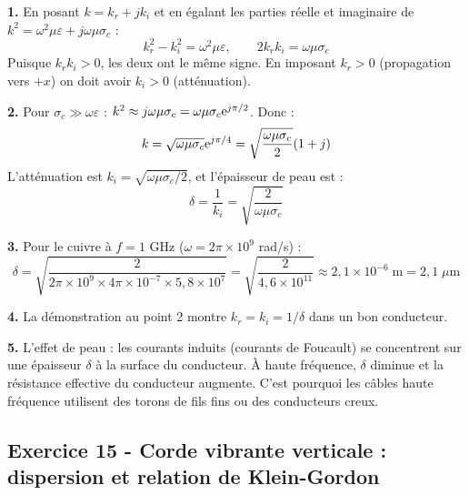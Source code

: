 \documentclass[12pt,a4paper]{article}
\begin{document}
\begin{boitecorrige}
\textbf{1.} En posant $k = k_r+jk_i$ et en égalant les parties réelle et imaginaire de $k^2 = \omega^2\mu\varepsilon + j\omega\mu\sigma_c$ :
\[
k_r^2 - k_i^2 = \omega^2\mu\varepsilon, \qquad 2k_r k_i = \omega\mu\sigma_c
\]
Puisque $k_r k_i > 0$, les deux ont le même signe. En imposant $k_r > 0$ (propagation vers $+x$) on doit avoir $k_i > 0$ (atténuation).

\textbf{2.} Pour $\sigma_c\gg\omega\varepsilon$ : $k^2\approx j\omega\mu\sigma_c = \omega\mu\sigma_c\mathrm{e}^{j\pi/2}$. Donc :
\[
k = \sqrt{\omega\mu\sigma_c}\mathrm{e}^{j\pi/4} = \sqrt{\frac{\omega\mu\sigma_c}{2}}(1+j)
\]
L'atténuation est $k_i = \sqrt{\omega\mu\sigma_c/2}$, et l'épaisseur de peau est :
\[
\delta = \frac{1}{k_i} = \sqrt{\frac{2}{\omega\mu\sigma_c}}
\]

\textbf{3.} Pour le cuivre à $f=1$ GHz ($\omega = 2\pi\times10^9$ rad/s) :
\[
\delta = \sqrt{\frac{2}{2\pi\times10^9\times4\pi\times10^{-7}\times5{,}8\times10^7}} = \sqrt{\frac{2}{4{,}6\times10^{11}}}\approx 2{,}1\times10^{-6}\;\text{m} = 2{,}1\;\mu\text{m}
\]

\textbf{4.} La démonstration au point 2 montre $k_r = k_i = 1/\delta$ dans un bon conducteur.

\textbf{5.} L'effet de peau : les courants induits (courants de Foucault) se concentrent sur une épaisseur $\delta$ à la surface du conducteur. À haute fréquence, $\delta$ diminue et la résistance effective du conducteur augmente. C'est pourquoi les câbles haute fréquence utilisent des torons de fils fins ou des conducteurs creux.
\end{boitecorrige}


\subsection*{Exercice 15 - Corde vibrante verticale : dispersion et relation de Klein-Gordon \niveau{\difficile}}
\end{document}
